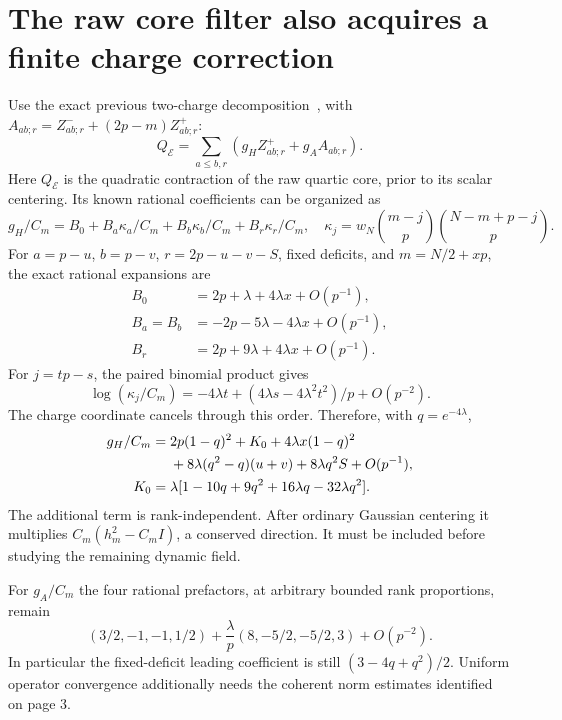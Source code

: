 \documentclass[11pt,a4paper]{article}
\begin{document}
\section{The raw core filter also acquires a finite charge correction}
Use the exact previous two-charge decomposition~\cite{local},
with $A_{ab;r}=Z^-_{ab;r}+(2p-m)Z^+_{ab;r}$:
\begin{equation}
 Q_{\mathcal E}=\sum_{a\le b,r}
 (g_H Z^+_{ab;r}+g_A A_{ab;r}).
\end{equation}
Here $Q_{\mathcal E}$ is the quadratic contraction of the raw
quartic core, prior to its scalar centering. Its known rational
coefficients can be organized as
\begin{equation}
 g_H/C_m=B_0+B_a\kappa_a/C_m+B_b\kappa_b/C_m+B_r\kappa_r/C_m,
 \quad \kappa_j=w_N\binom{m-j}p\binom{N-m+p-j}p.
\end{equation}
For $a=p-u$, $b=p-v$, $r=2p-u-v-S$, fixed deficits, and
$m=N/2+xp$, the exact rational expansions are
\begin{align}
 B_0&=2p+\lambda+4\lambda x+O(p^{-1}),\\
 B_a=B_b&=-2p-5\lambda-4\lambda x+O(p^{-1}),\\
 B_r&=2p+9\lambda+4\lambda x+O(p^{-1}).
\end{align}
For $j=tp-s$, the paired binomial product gives
\begin{equation}
 \log(\kappa_j/C_m)=-4\lambda t+
 (4\lambda s-4\lambda^2t^2)/p+O(p^{-2}).
\end{equation}
The charge coordinate cancels through this order. Therefore,
with $q=e^{-4\lambda}$,
\begin{align}
 g_H/C_m={}&2p(1-q)^2+K_0+4\lambda x(1-q)^2\notag\\
 &+8\lambda(q^2-q)(u+v)+8\lambda q^2S+O(p^{-1}),\label{gH}\\
 K_0={}&\lambda[1-10q+9q^2+16\lambda q-32\lambda q^2].
\end{align}
The additional term is rank-independent. After ordinary Gaussian
centering it multiplies $C_m(h_m^2-C_mI)$, a conserved direction.
It must be included before studying the remaining dynamic field.

For $g_A/C_m$ the four rational prefactors, at arbitrary bounded
rank proportions, remain
\begin{equation}
 (3/2,-1,-1,1/2)+\frac{\lambda}{p}(8,-5/2,-5/2,3)+O(p^{-2}).
\end{equation}
In particular the fixed-deficit leading coefficient is still
$(3-4q+q^2)/2$. Uniform operator convergence additionally needs
the coherent norm estimates identified on page 3.
\end{document}
